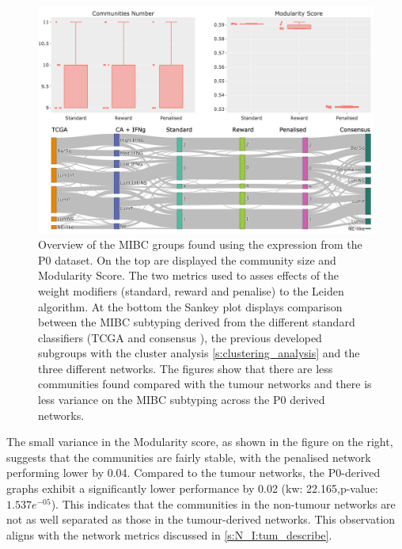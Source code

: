 \begin{figure}[!b]    
    \centering
    \includegraphics[width=1.0\textwidth,keepaspectratio]{Sections/Network_I/Resources/P0/Ldn_Sky_TF_50_RawKMeans_K5_v3.png}
    \caption[P0: Leiden metrics]{Overview of the MIBC groups found using the expression from the P0 dataset. On the top are displayed the community size and Modularity Score. The two metrics used to asses effects of the weight modifiers (standard, reward and penalise) to the Leiden algorithm. At the bottom the Sankey plot displays comparison between the MIBC subtyping derived from the different standard classifiers (TCGA \citep{Robertson2017-mg} and consensus \citep{Kamoun2020-tj}), the previous developed subgroups with the cluster analysis \cref{s:clustering_analysis} and the three different networks. The figures show that there are less communities found compared with the tumour networks and there is less variance on the MIBC subtyping across the P0 derived networks. }
    \label{fig:N_I:p0_sky_leiden}
\end{figure}

The small variance in the Modularity score, as shown in the figure on the right, suggests that the communities are fairly stable, with the penalised network performing lower by 0.04. Compared to the tumour networks, the P0-derived graphs exhibit a significantly lower performance by 0.02 (\acrshort{kw}: 22.165,p-value: $1.537e^{-05}$). This indicates that the communities in the non-tumour networks are not as well separated as those in the tumour-derived networks. This observation aligns with the network metrics discussed in \cref{s:N_I:tum_describe}.


